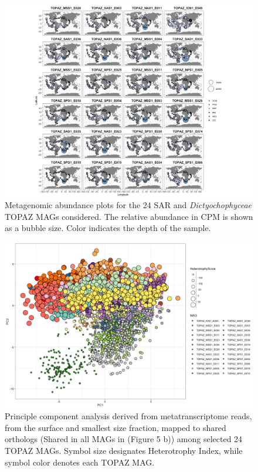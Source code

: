 \documentclass[12pt]{article}
\numberwithin{equation}{section}
\begin{document}
\begin{figure}
    \centering
    \includegraphics[width=0.95\columnwidth]{si-figures/SI-stramenopile-MAG-map.png}
    \caption{Metagenomic abundance plots for the 24 SAR and  \textit{Dictyochophyceae} TOPAZ MAGs considered. The relative abundance in CPM is shown as a bubble size. Color indicates the depth of the sample. }
    \label{fig:dictyocho-SAR-map}
\end{figure}

\begin{figure}
    \centering
    \includegraphics[width=0.9\columnwidth]{si-figures/SI-SAR-Dictyocho-PCA-byMAG.png}
    \caption{Principle component analysis derived from metatranscriptome reads, from the surface and smallest size fraction, mapped to shared orthologs (Shared in all MAGs in (Figure 5 b)) among selected 24 TOPAZ MAGs. Symbol size designates Heterotrophy Index, while symbol color denotes each TOPAZ MAG.}
    \label{fig:dictyocho-SAR-PCA-mag}
\end{figure}
\end{document}
